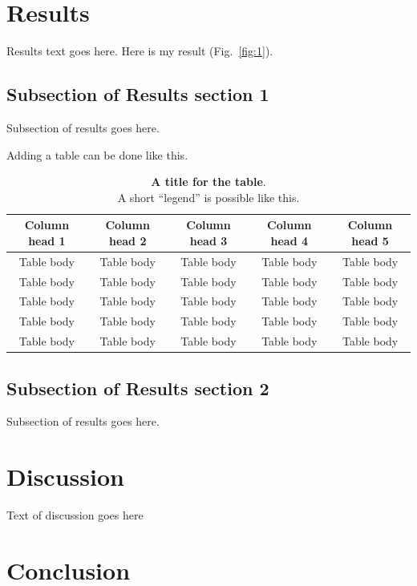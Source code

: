 \documentclass[11pt,a4paper]{article}
\begin{document}
\section*{Results}

Results text goes here. 
Here is my result (Fig.~\ref{fig:1}).
\lipsum[19]

\subsection*{Subsection of Results section 1}
Subsection of results goes here.
\lipsum[20]

Adding a table can be done like this.

\begin{table}[!htp]
    \centering
    \begin{tabular}{c | c c c c}
    Column head 1 & Column head 2 & Column head 3 & Column head 4 & Column head 5\\
    \hline
    Table body & Table body & Table body  & Table body  & Table body  \\
    Table body & Table body & Table body  & Table body  & Table body  \\
    Table body & Table body & Table body  & Table body  & Table body  \\
    Table body & Table body & Table body  & Table body  & Table body  \\
    Table body & Table body & Table body  & Table body  & Table body  \\
    \end{tabular}
    \caption{
        \textbf{A title for the table}.\\
        A short ``legend'' is possible like this.}
    \label{table:example}
\end{table}


\subsection*{Subsection of Results section 2}
Subsection of results goes here.
\lipsum[21]

\section*{Discussion}

Text of discussion goes here


\section*{Conclusion}
\end{document}
